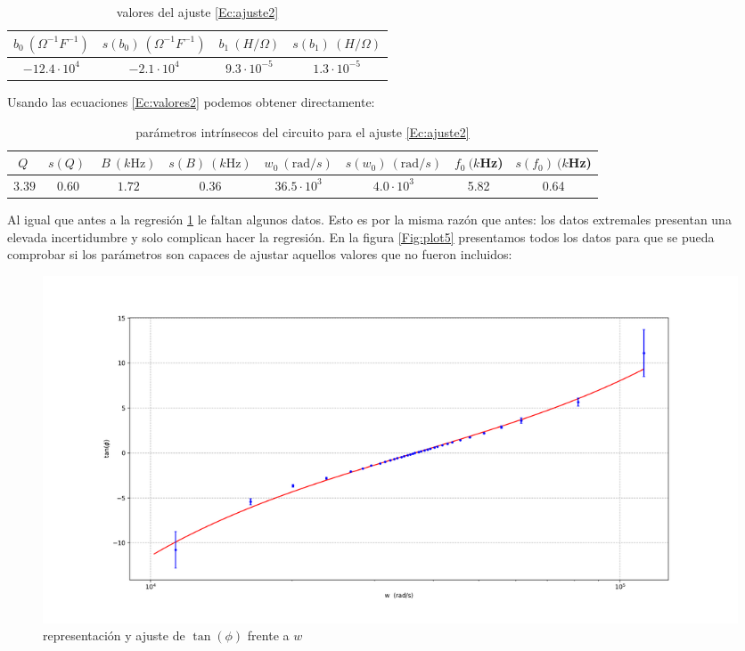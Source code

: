 \documentclass[12pt,a4paper]{article}
\newcommand{\Hz}{\mathrm{Hz} }
\begin{document}
\begin{table}[h!] 	 \centering 
\begin{tabular}{|c|c|c|c|} 
\hline 
$b_0 \ (\Omega^{-1} F^{-1}) $  & $s(b_0) \ (\Omega^{-1} F^{-1})$ & $ b_1 \ (H/\Omega)$ & $s(b_1) \ (H/\Omega)$    \\ \hline 
$-12.4 \cdot 10^{4}$  & $-2.1 \cdot 10^{4}$ & $ 9.3 \cdot 10^{-5} $ & $1.3 \cdot 10^{-5} $ \\ 
\hline
\end{tabular} 
\caption{valores del ajuste \ref{Ec:ajuste2}} 
\label{Tab:regresion2} 
\end{table} 
 
 


Usando las ecuaciones \ref{Ec:valores2} podemos obtener directamente:\\
 
\begin{table}[h!] 	 \centering 
\begin{tabular}{|c|c|c|c|c|c|c|c|} 
\hline 
$Q \  $  & $s(Q) \ $ & $ B \ (k \Hz)$ & $s(B) \ (k \Hz)$ & $w_0 \ (\mathrm{rad}/s)  $ &  $s(w_0) \ (\mathrm{rad}/s)$  & $f_0 \ (k$Hz) & $s(f_0) \ (k$Hz) \\ \hline 
$3.39 $  & $0.60 $ & $ 1.72 $ & $0.36$ & $36.5 \cdot 10^3 $ & $4.0 \cdot 10^3 $ & 5.82 & 0.64 \\ 
\hline
\end{tabular} 
\caption{parámetros intrínsecos del circuito para el ajuste \ref{Ec:ajuste2}} 
\label{Tab:valores3} 
\end{table} 
 

Al igual que antes a la regresión \ref{Fig:plot4} le faltan algunos datos. Esto es por la misma razón que antes: los datos extremales presentan una elevada incertidumbre y solo complican hacer la regresión. En la figura \ref{Fig:plot5} presentamos todos los datos para que se pueda comprobar si los parámetros son capaces de ajustar aquellos valores que no fueron incluidos:


\begin{figure}[h!] \centering
\includegraphics[scale=0.45]{plot3.png}
\caption{representación y ajuste de $\tan(\phi)$ frente a $w$}
\label{Fig:plot4}
\end{figure}
\end{document}
